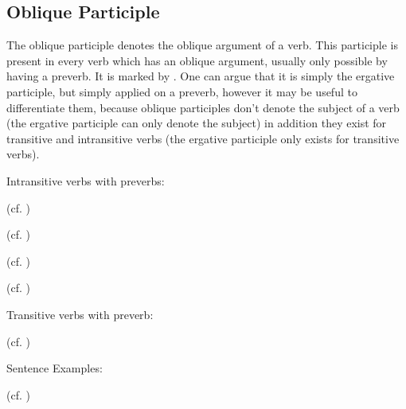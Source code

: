 \documentclass[a4paper, 10pt]{book}
\begin{document}
\subsection{Oblique Participle}
The oblique participle denotes the oblique argument of a verb. This participle is present in every verb which has an oblique argument, usually only possible by having a preverb. It is marked by . One can argue that it is simply the ergative participle, but simply applied on a preverb, however it may be useful to differentiate them, because oblique participles don't denote the subject of a verb (the ergative participle can only denote the subject) in addition they exist for transitive and intransitive verbs (the ergative participle only exists for transitive verbs). 

Intransitive verbs with preverbs: 
\begin{exe}
    \ex
    \begin{xlist}
    \item {} (cf. )
    \item {} (cf. )
    \item {} (cf. )
    \item {} (cf. )
\end{xlist}
\end{exe}

Transitive verbs with preverb:
\begin{exe}
    \ex
    \begin{xlist} 
    \item {} (cf. )
\end{xlist}
\end{exe}


Sentence Examples:
\begin{exe}
    \ex
    \begin{xlist}   
    \item {} (cf. )
\end{xlist}
\end{exe}
\end{document}
